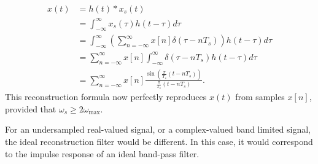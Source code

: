 \begin{align}
 x(t) &= h(t)*x_s(t)\\
 &= \int_{-\infty}^{\infty} x_s(\tau)h(t-\tau)d\tau\\
 &= \int_{-\infty}^{\infty}\left( \sum_{n=-\infty}^{\infty} x[n] \delta(\tau-n T_s)\right) h(t-\tau) d\tau \\
&= \sum_{n=-\infty}^{\infty} x[n] \int_{-\infty}^{\infty} \delta(\tau-nT_s) h(t-\tau)d\tau \\
&= \sum_{n=-\infty}^{\infty} x[n] \frac{\sin(\frac{\pi}{T_s}(t-n T_s))}{\frac{\pi}{T_s}(t-nT_s)}.
\end{align}
This reconstruction formula now perfectly reproduces $x(t)$ from
samples $x[n]$, provided that $\omega_s \ge 2\omega_{\mathrm{max}}$.

For an undersampled real-valued signal, or a complex-valued band limited signal, the ideal reconstruction filter would be different. 
In this case, it would correspond to the impulse response of an ideal band-pass filter.

